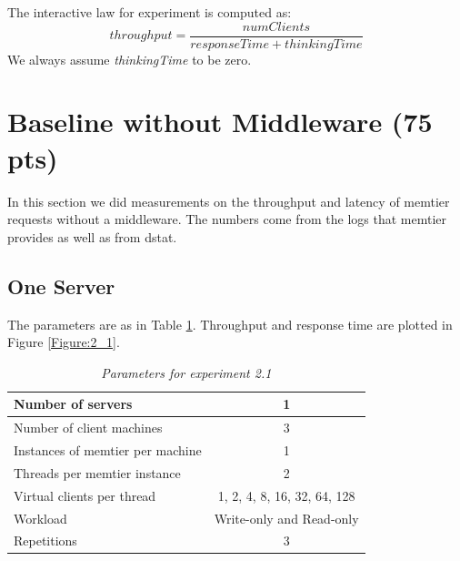 \documentclass[11pt,a4paper]{article}
\newcommand{\ku}[1]{\textit{#1}}
\begin{document}
The interactive law for experiment is computed as:
\begin{equation}
	throughput = \frac{numClients}{responseTime + thinkingTime }
\end{equation}
We always assume \ku{thinkingTime} to be zero.

\section{Baseline without Middleware (75 pts)}
In this section we did measurements on the throughput and latency of memtier requests without a middleware. The numbers come from the logs that memtier provides as well as from dstat.
\subsection{One Server}
The parameters are as in Table \ref{Table:2_1_table}. Throughput and response time are plotted in Figure \ref{Figure:2_1}. 

	\begin{table}[H]
	\centering
		\begin{tabular}{|l|c|} 
			\hline Number of servers                				& 1                        \\ 
			\hline Number of client machines        		& 3                        \\ 
			\hline Instances of memtier per machine 	& 1                        \\ 
			\hline Threads per memtier instance     		& 2                        \\
			\hline Virtual clients per thread       			& 1, 2, 4, 8, 16, 32, 64, 128                 \\ 
			\hline Workload                         					& Write-only and Read-only \\
			\hline Repetitions                      					& 3                 \\ 
			\hline 
		\end{tabular}
		\caption{\textit{Parameters for experiment 2.1}}
		\label{Table:2_1_table}
	\end{table}
\end{document}
